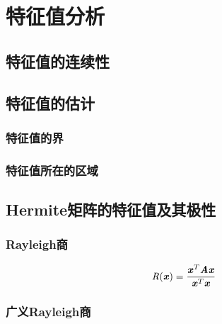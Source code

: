 \chapter{特征值分析}
\label{cha:特征值分析}



\section{特征值的连续性}
\label{sec:特征值的连续性}

\section{特征值的估计}
\label{sec:特征值的估计}

\subsection{特征值的界}
\label{sub:特征值的界}

\subsection{特征值所在的区域}
\label{sub:特征值所在的区域}

\section{Hermite矩阵的特征值及其极性}
\label{sec:Hermite矩阵的特征值及其极性}

\subsection{Rayleigh商}
\label{sub:Rayleigh商}

\begin{definition}[Rayleigh商]
    $$
    \mathit{R}(\boldsymbol{\mathit{x}}) = \frac{\boldsymbol{\mathit{x}}^T \boldsymbol{\mathit{A}} \boldsymbol{\mathit{x}}}{\boldsymbol{\mathit{x}}^T\boldsymbol{\mathit{x}}}
    $$
\end{definition}

\subsection{广义Rayleigh商}
\label{sub:广义Rayleigh商}


